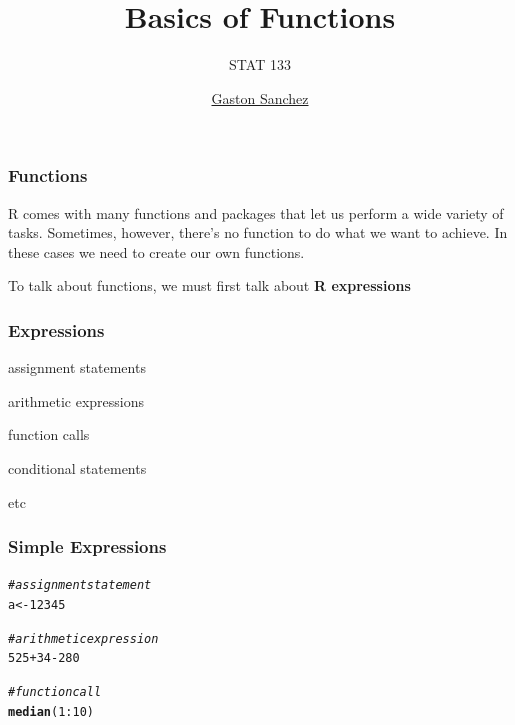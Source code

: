 \documentclass[12pt]{beamer}\usepackage[]{graphicx}\usepackage[]{color}
\title{Basics of Functions}
\subtitle{STAT 133}
\author{\href{http://www.gastonsanchez.com}{Gaston Sanchez}}
\institute{\href{https://github.com/ucb-stat133/stat133-fall-2016}{\tt \scriptsize \color{foreground} github.com/ucb-stat133/stat133-fall-2016}}
\date{}
\makeatletter
\newcommand{\hlnum}[1]{\textcolor[rgb]{0.686,0.059,0.569}{#1}}%
\newcommand{\hlcom}[1]{\textcolor[rgb]{0.678,0.584,0.686}{\textit{#1}}}%
\newcommand{\hlopt}[1]{\textcolor[rgb]{0,0,0}{#1}}%
\newcommand{\hlstd}[1]{\textcolor[rgb]{0.345,0.345,0.345}{#1}}%
\newcommand{\hlkwb}[1]{\textcolor[rgb]{0.69,0.353,0.396}{#1}}%
\newcommand{\hlkwd}[1]{\textcolor[rgb]{0.737,0.353,0.396}{\textbf{#1}}}%
\newenvironment{kframe}{%
 \def\at@end@of@kframe{}%
 \ifinner\ifhmode%
  \def\at@end@of@kframe{\end{minipage}}%
  \begin{minipage}{\columnwidth}%
 \fi\fi%
 \def\FrameCommand##1{\hskip\@totalleftmargin \hskip-\fboxsep
 \colorbox{shadecolor}{##1}\hskip-\fboxsep
     \hskip-\linewidth \hskip-\@totalleftmargin \hskip\columnwidth}%
 \MakeFramed {\advance\hsize-\width
   \@totalleftmargin\z@ \linewidth\hsize
   \@setminipage}}%
 {\par\unskip\endMakeFramed%
 \at@end@of@kframe}
\newenvironment{knitrout}{}{} %
\makeatother
\begin{document}
{
  \frame{
    \titlepage
  } 
}


\begin{frame}
\frametitle{Functions}

R comes with many functions and packages that let us perform a wide variety of tasks. Sometimes, however, there's no function to do what we want to achieve. In these cases we need to create our own functions.

To talk about functions, we must first talk about \textbf{R expressions}

\end{frame}


\begin{frame}
\begin{center}
\Huge{}
\end{center}
\end{frame}


\begin{frame}[fragile]
\frametitle{Expressions}

\bbi
  \item assignment statements
  \item arithmetic expressions
  \item function calls
  \item conditional statements
  \item etc
\ei
\eb

\end{frame}


\begin{frame}[fragile]
\frametitle{Simple Expressions}
\begin{knitrout}\footnotesize
{}\color{fgcolor}\begin{kframe}
\begin{alltt}
\hlcom{# assignment statement}
\hlstd{a} \hlkwb{<-} \hlnum{12345}

\hlcom{# arithmetic expression}
\hlnum{525} \hlopt{+} \hlnum{34} \hlopt{-} \hlnum{280}

\hlcom{# function call}
\hlkwd{median}\hlstd{(}\hlnum{1}\hlopt{:}\hlnum{10}\hlstd{)}
\end{alltt}
\end{kframe}
\end{knitrout}
\end{frame}
\end{document}
